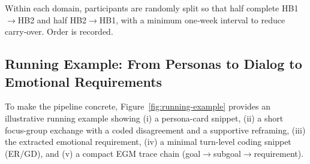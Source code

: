 \documentclass[acmsmall]{acmart}
\begin{document}
Within each domain, participants are randomly split so that half complete HB1$\rightarrow$HB2 and half HB2$\rightarrow$HB1, with a minimum one‑week interval to reduce carry‑over. Order is recorded.

\subsection{Running Example: From Personas to Dialog to Emotional Requirements}
\label{sec:running-example}
To make the pipeline concrete, Figure~\ref{fig:running-example} provides an illustrative running example showing (i) a persona-card snippet, (ii) a short focus-group exchange with a coded disagreement and a supportive reframing, (iii) the extracted emotional requirement, (iv) a minimal turn-level coding snippet (ER/GD), and (v) a compact EGM trace chain (goal$\rightarrow$subgoal$\rightarrow$requirement).
\end{document}

